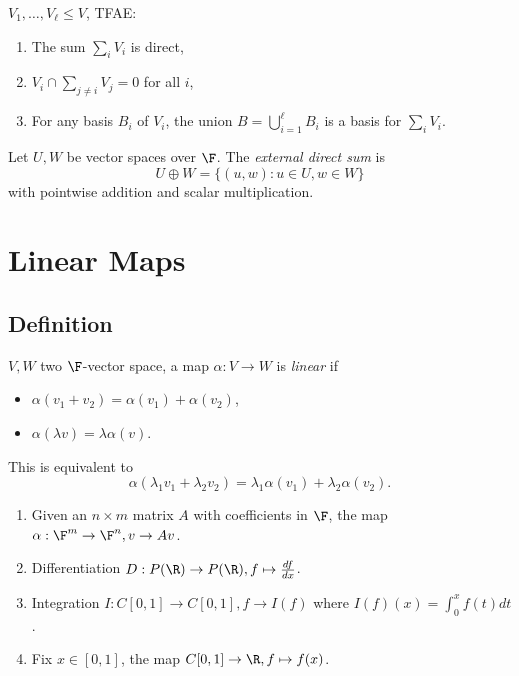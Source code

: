 \documentclass[a4paper]{article}
\theoremstyle{definition}
\begin{document}
\begin{ex}
  \(V_1,\ldots, V_\ell \leq V\), TFAE:
  \begin{enumerate}
  \item The sum \(\sum_i V_i\) is direct,
  \item \(V_i \cap \sum_{j\neq i}V_j = 0\) for all \(i\),
  \item For any basis \(B_i\) of \(V_i\), the union \(B=\bigcup_{i=1}^\ell B_i\) is a basis for \(\sum_i V_i\).
  \end{enumerate}
\end{ex}

\begin{definition}
  Let \(U, W\) be vector spaces over \(\F\). The \emph{external direct sum} is
  \[
U\oplus W = \{(u,w): u\in U, w\in W\}
  \]
  with pointwise addition and scalar multiplication.
\end{definition}

\section{Linear Maps}

\subsection{Definition}

\begin{definition}
  \(V, W\) two \(\F\)-vector space, a map \(\alpha: V\to W\) is \emph{linear} if
  \begin{itemize}
  \item \(\alpha(v_1 + v_2) = \alpha(v_1) + \alpha(v_2)\),
  \item \(\alpha(\lambda v) = \lambda \alpha(v)\).
  \end{itemize}
  This is equivalent to
  \[
\alpha(\lambda_1v_1+ \lambda_2v_2) = \lambda_1\alpha(v_1) + \lambda_2\alpha(v_2).
  \]
\end{definition}

\begin{eg}\leavevmode
  \begin{enumerate}
  \item Given an \(n\times m\) matrix \(A\) with coefficients in \(\F\), the map \(\alpha: \F^m\to \F^n, v\to Av\).
  \item Differentiation \(D: P(\R) \to P(\R), f\mapsto \frac{df}{dx}\).
  \item Integration \(I: C[0,1] \to C[0,1], f\to I(f)\) where \(I(f)(x) = \int_0^x f(t)dt\).
  \item Fix \(x\in [0,1]\), the map \(C[0,1]\to \R, f\mapsto f(x)\).
  \end{enumerate}
\end{eg}
\end{document}
